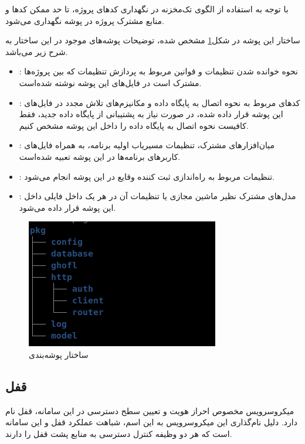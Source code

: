 با توجه به استفاده از الگوی تک‌مخزنه در نگهداری کد‌های پروژه، تا حد ممکن کد‌ها و منابع مشترک پروژه در پوشه  نگهداری می‌شود. 

ساختار این پوشه در شکل\ref{fig:pkg-dir} مشخص شده، توضیحات پوشه‌های موجود در این ساختار به شرح زیر می‌باشد.
\begin{itemize}
	\item {}: نحوه خوانده شدن تنظیمات و قوانین مربوط به پردازش تنظیمات که بین پروژه‌ها مشترک است در فایل‌های این پوشه نوشته شده‌است.
	\item {}: کد‌های مربوط به نحوه اتصال به پایگاه داده و مکانیزم‌های تلاش مجدد در فایل‌های این پوشه قرار داده شده، در صورت نیاز به پشتیبانی از پایگاه داده جدید، فقط کافیست نحوه اتصال به پایگاه داده را داخل این پوشه مشخص کنیم.
	\item {}: میان‌افزارهای مشترک، تنظیمات مسیریاب اولیه برنامه، به همراه فایل‌های کاربر‌های برنامه‌ها در این پوشه تعبیه شده‌است.
	\item {}: تنظیمات مربوط به راه‌اندازی ثبت کننده وقایع در این پوشه انجام می‌شود.
	\item {}: مدل‌های مشترک نظیر ماشین مجازی یا تنظیمات آن در هر یک داخل فایلی داخل این پوشه قرار داده می‌شود.
\end{itemize}

\begin{figure}
	\vspace{1cm}
	\centering
	\includegraphics[scale=0.55]{figures/pkg-dir.png}
	\caption{ساختار پوشه‌بندی }
	\label{fig:pkg-dir}
\end{figure}

\subsection{قفل}
میکروسرویس مخصوص احراز‌ هویت و تعیین سطح دسترسی در این سامانه، قفل نام دارد. دلیل نام‌گذاری این میکروسرویس به این اسم، شباهت عملکرد قفل و این سامانه است که هر دو وظیفه کنترل دسترسی به منابع پشت قفل را دارند.

